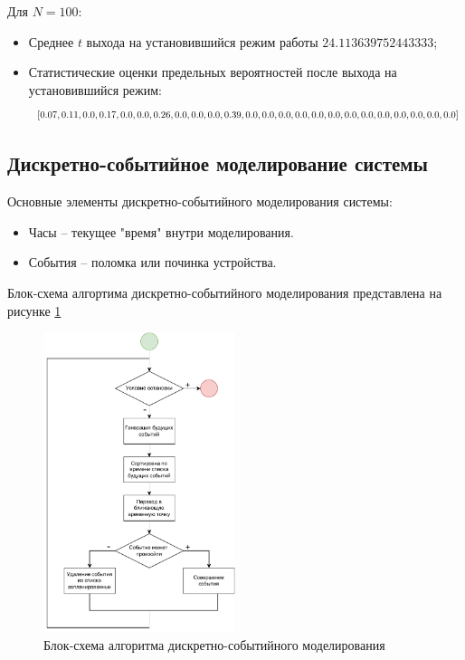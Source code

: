 Для $N=100$:
\begin{itemize}
    \item Среднее $t$ выхода на установившийся режим работы $24.113639752443333$;

    \item Статистические оценки предельных вероятностей после выхода на установившийся режим:
    \[
    \resizebox{\textwidth}{!}{$
[0.07, 0.11, 0.0, 0.17, 0.0, 0.0, 0.26, 0.0, 0.0, 0.0, 0.39, 0.0, 0.0, 0.0, 0.0, 0.0, 0.0, 0.0, 0.0, 0.0, 0.0, 0.0, 0.0, 0.0]
     $}
\]

\end{itemize}

\subsection{Дискретно-событийное моделирование системы}

Основные элементы дискретно-событийного моделирования системы:
\begin{itemize}
    \item Часы -- текущее "время" внутри моделирования.
    \item События -- поломка или починка устройства.
\end{itemize}
Блок-схема алгортима дискретно-событийного моделирования представлена на рисунке \ref{BS}

\begin{figure}[H]
\centerline{\includegraphics[width=0.5\textwidth]{Images/BS.pdf}}
\caption{Блок-схема алгоритма дискретно-событийного моделирования}
\label{BS}
\end{figure}

